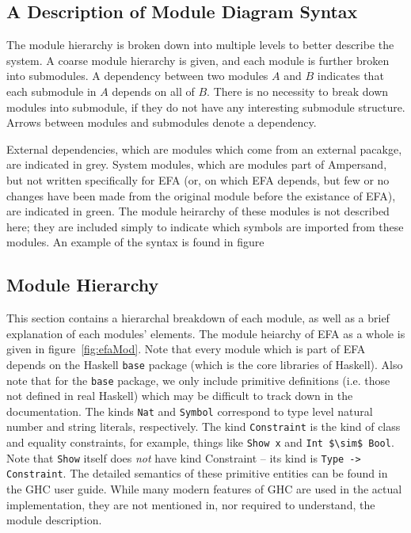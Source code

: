     

\subsection{A Description of Module Diagram Syntax}\label{subsec:ModuleSyntax}

The module hierarchy is broken down into multiple levels to better describe the
system.  A coarse module hierarchy is given, and each module is further broken
into submodules.  A dependency between two modules $A$ and $B$ indicates that
each submodule in $A$ depends on all of $B$. There is no necessity to break
down modules into submodule, if they do not have any interesting submodule 
structure. Arrows between modules and submodules denote a dependency. 

External dependencies, which are modules which come from an external pacakge,
are indicated in {\color{grey}grey}. System modules, which are modules part of
Ampersand, but not written specifically for EFA (or, on which EFA depends, but
few or no changes have been made from the original module before the existance
of EFA), are indicated in {\color{applegreen}green}. The module heirarchy of
these modules is not described here; they are included simply to indicate which
symbols are imported from these modules. An example of the syntax is found in
figure%

\subsection{Module Hierarchy}

This section contains a hierarchal breakdown of each module, as well as a brief
explanation of each modules' elements. The module heiarchy of EFA as a whole is 
given in figure~\ref{fig:efaMod}.  Note
that every module which is part of EFA depends on the Haskell \texttt{base} 
package
(which is the core libraries of Haskell). Also note that for the \texttt{base}
package, we only include primitive definitions (i.e. those not defined in real
Haskell) which may be difficult to track down in the documentation. The kinds
\lstinline{Nat} and \lstinline{Symbol} correspond to type level natural number 
and string
literals, respectively. The kind \lstinline{Constraint} is the kind of class and
equality constraints, for example, things like \lstinline{Show x} and 
\lstinline[mathescape]|Int $\sim$ Bool|.  
Note that \texttt{Show} itself does \emph{not} have kind Constraint --
its kind is \lstinline{Type -> Constraint}. The detailed semantics of these
primitive entities can be found in the GHC user guide\citep{ghcUserGuide}. While
many modern features of GHC are used in the actual implementation, they are not
mentioned in, nor required to understand, the module description.

